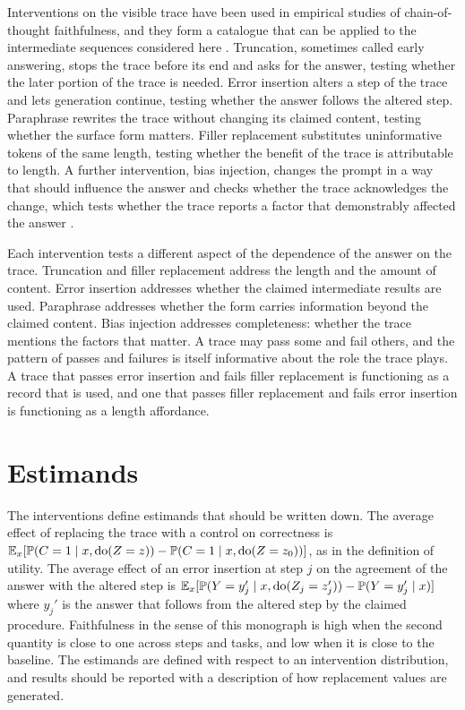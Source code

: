 Interventions on the visible trace have been used in empirical studies of chain-of-thought faithfulness, and they form a catalogue that can be applied to the intermediate sequences considered here \cite{lanham2023}. Truncation, sometimes called early answering, stops the trace before its end and asks for the answer, testing whether the later portion of the trace is needed. Error insertion alters a step of the trace and lets generation continue, testing whether the answer follows the altered step. Paraphrase rewrites the trace without changing its claimed content, testing whether the surface form matters. Filler replacement substitutes uninformative tokens of the same length, testing whether the benefit of the trace is attributable to length. A further intervention, bias injection, changes the prompt in a way that should influence the answer and checks whether the trace acknowledges the change, which tests whether the trace reports a factor that demonstrably affected the answer \cite{turpin2023}.

Each intervention tests a different aspect of the dependence of the answer on the trace. Truncation and filler replacement address the length and the amount of content. Error insertion addresses whether the claimed intermediate results are used. Paraphrase addresses whether the form carries information beyond the claimed content. Bias injection addresses completeness: whether the trace mentions the factors that matter. A trace may pass some and fail others, and the pattern of passes and failures is itself informative about the role the trace plays. A trace that passes error insertion and fails filler replacement is functioning as a record that is used, and one that passes filler replacement and fails error insertion is functioning as a length affordance.

\section{Estimands}

The interventions define estimands that should be written down. The average effect of replacing the trace with a control on correctness is $\mathbb{E}_x[\mathbb{P}(C=1\mid x,\operatorname{do}(Z=z))-\mathbb{P}(C=1\mid x,\operatorname{do}(Z=z_0))]$, as in the definition of utility. The average effect of an error insertion at step $j$ on the agreement of the answer with the altered step is $\mathbb{E}_x[\mathbb{P}(Y=y_j'\mid x,\operatorname{do}(Z_j=z_j'))-\mathbb{P}(Y=y_j'\mid x)]$ where $y_j'$ is the answer that follows from the altered step by the claimed procedure. Faithfulness in the sense of this monograph is high when the second quantity is close to one across steps and tasks, and low when it is close to the baseline. The estimands are defined with respect to an intervention distribution, and results should be reported with a description of how replacement values are generated.

